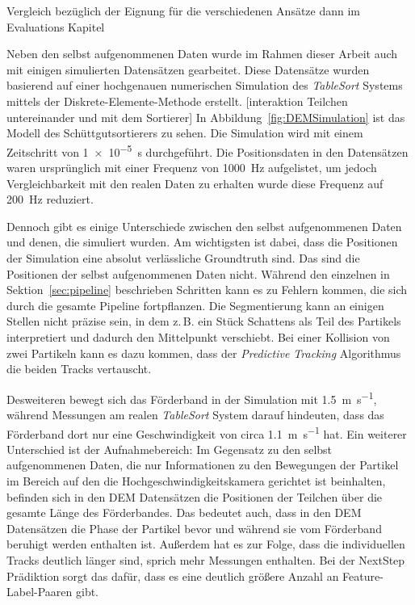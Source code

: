 Vergleich bezüglich der Eignung für die verschiedenen Ansätze dann im Evaluations Kapitel
\color{black}

Neben den selbst aufgenommenen Daten wurde im Rahmen dieser Arbeit auch mit einigen simulierten Datensätzen gearbeitet.
Diese Datensätze wurden basierend auf einer hochgenauen numerischen Simulation des \textit{TableSort} Systems mittels der Diskrete-Elemente-Methode erstellt.
[interaktion Teilchen untereinander und mit dem Sortierer]
In Abbildung~\ref{fig:DEMSimulation} ist das Modell des Schüttgutsortierers zu sehen.
Die Simulation wird mit einem Zeitschritt von \SI{1e-5}{\second} durchgeführt.
Die Positionsdaten in den Datensätzen waren ursprünglich mit einer Frequenz von \SI{1000}{\hertz} aufgelistet,
um jedoch Vergleichbarkeit mit den realen Daten zu erhalten wurde diese Frequenz auf \SI{200}{\hertz} reduziert.


Dennoch gibt es einige Unterschiede zwischen den selbst aufgenommenen Daten und denen, die simuliert wurden.
Am wichtigsten ist dabei, dass die Positionen der Simulation eine absolut verlässliche Groundtruth sind.
Das sind die Positionen der selbst aufgenommenen Daten nicht.
Während den einzelnen in Sektion~\ref{sec:pipeline} beschrieben Schritten kann es zu Fehlern kommen, die sich durch die gesamte Pipeline fortpflanzen.
Die Segmentierung kann an einigen Stellen nicht präzise sein, in dem z.\,B. ein Stück Schattens als Teil des Partikels interpretiert und dadurch den Mittelpunkt verschiebt. 
Bei einer Kollision von zwei Partikeln kann es dazu kommen, dass der \textit{Predictive Tracking} Algorithmus die beiden Tracks vertauscht.  

Desweiteren bewegt sich das Förderband in der Simulation mit \SI{1.5}{\meter\per\second}, 
während Messungen am realen \textit{TableSort} System darauf hindeuten, dass das Förderband dort nur eine Geschwindigkeit von 
circa \SI{1.1}{\meter\per\second} hat.
Ein weiterer Unterschied ist der Aufnahmebereich: Im Gegensatz zu den selbst aufgenommenen Daten, die nur Informationen 
zu den Bewegungen der Partikel im Bereich auf den die Hochgeschwindigkeitskamera gerichtet ist beinhalten, 
befinden sich in den DEM Datensätzen die Positionen der Teilchen über die gesamte Länge des Förderbandes.
Das bedeutet auch, dass in den DEM Datensätzen die Phase der Partikel bevor und während sie vom Förderband beruhigt werden enthalten ist.
Außerdem hat es zur Folge, dass die individuellen Tracks deutlich länger sind, sprich mehr Messungen enthalten.
Bei der NextStep Prädiktion sorgt das dafür, dass es eine deutlich größere Anzahl an Feature-Label-Paaren gibt.



